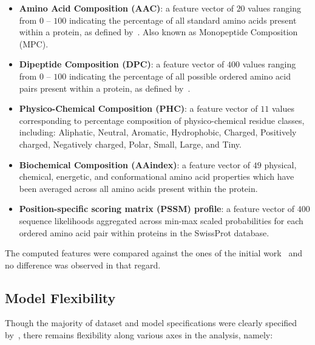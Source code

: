 \begin{itemize}
\item \textbf{Amino Acid Composition (AAC)}: a feature vector of $20$ values ranging from $0$ -- $100$ indicating the
percentage of all standard amino acids present within a protein, as defined by~\cite{gromiha2010protein}. Also known
as Monopeptide Composition (MPC).
\item \textbf{Dipeptide Composition (DPC)}: a feature vector of $400$ values ranging from $0$ -- $100$ indicating the
percentage of all possible ordered amino acid pairs present within a protein, as defined by~\cite{gromiha2010protein}.
\item \textbf{Physico-Chemical Composition (PHC)}: a feature vector of $11$ values corresponding
to percentage composition of physico-chemical residue classes, including: Aliphatic, Neutral, Aromatic, Hydrophobic, Charged, Positively charged,
Negatively charged, Polar, Small, Large, and Tiny. 
\item \textbf{Biochemical Composition (AAindex)}: a feature vector of $49$ physical, chemical, energetic, and
conformational amino acid properties which have been averaged across all amino acids present within the protein.
\item \textbf{Position-specific scoring matrix (PSSM) profile}: a feature vector of $400$ sequence 
likelihoods aggregated across min-max scaled probabilities for each ordered amino acid pair within 
proteins in the SwissProt database.
\end{itemize}

{The computed features were compared against the ones of the initial work~\cite{mishra2014prediction} and no difference was 
observed in that regard.}
\subsection{Model Flexibility}
\label{sec:modelflex}
Though the majority of dataset and model specifications were clearly specified by~\cite{mishra2014prediction}, there
remains flexibility along various axes in the analysis, namely:

